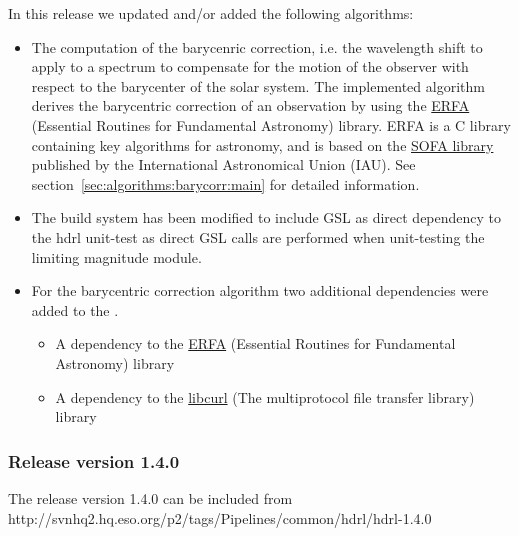In this release we updated and/or added the following algorithms:
\begin{itemize}
\item The computation of the barycenric correction, i.e. the
  wavelength shift to apply to a spectrum to compensate for the motion
  of the observer with respect to the barycenter of the solar system.
  The implemented algorithm derives the barycentric correction of an
  observation by using the
  \href{https://github.com/liberfa/erfa}{ERFA} (Essential Routines for
  Fundamental Astronomy) library. ERFA is a C library containing key
  algorithms for astronomy, and is based on the
  \href{http://www.iausofa.org}{SOFA library} published by the
  International Astronomical Union (IAU).  See
  section~\ref{sec:algorithms:barycorr:main} for detailed information.
\item The build system has been modified to include GSL as direct
   dependency to the hdrl unit-test as direct GSL calls are performed
   when unit-testing the limiting magnitude module.
 \item For the barycentric correction algorithm two additional
   dependencies were added to the \HDRL.
   \begin{itemize}
     \item A dependency to the
       \href{https://github.com/liberfa/erfa}{ERFA} (Essential
       Routines for Fundamental Astronomy) library
     \item A dependency to the
       \href{https://curl.se/libcurl/}{libcurl} (The multiprotocol
       file transfer library) library
   \end{itemize}  
\end{itemize}

\subsubsection{Release version 1.4.0}
The \HDRL release version 1.4.0 can be included from\\

http://svnhq2.hq.eso.org/p2/tags/Pipelines/common/hdrl/hdrl-1.4.0

